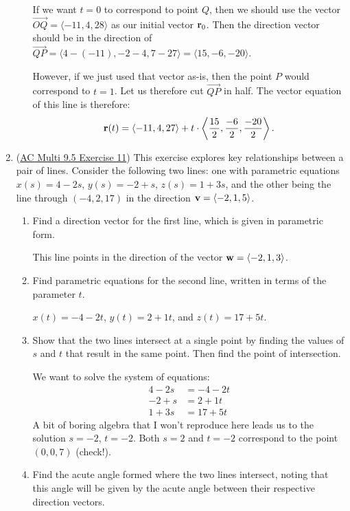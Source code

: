 \begin{enumerate}[leftmargin=0pt]
\begin{enumerate}
	\begin{red}
		If we want $t=0$ to correspond to point $Q$, then we should use the vector $\overrightarrow{OQ} = \langle -11, 4, 28 \rangle$ as our initial vector $\mathbf{r}_0$. Then the direction vector should be in the direction of $\overrightarrow{QP} = \langle 4-(-11), -2-4, 7-27 \rangle = \langle 15, -6, -20\rangle$. 
		
		However, if we just used that vector as-is, then the point $P$ would correspond to $t=1$. Let us therefore cut $\overrightarrow{QP}$ in half. The vector equation of this line is therefore:
		\[\mathbf{r}(t) = \langle -11, 4, 27 \rangle + t\cdot\left\langle \frac{15}{2}, \frac{-6}{2}, \frac{-20}{2}\right\rangle.\]
	\end{red}
\end{enumerate}
	
\item (\href{https://activecalculus.org/multi/S-9-5-Lines-Planes.html#Ez_9_5_2}{AC Multi 9.5 Exercise 11}) This exercise explores key relationships between a pair of lines. Consider the following two lines: one with parametric equations $x(s) = 4 - 2s$, $y(s) = -2 + s$, $z(s) = 1+3s$, and the other being the line through $(-4,2,17)$ in the direction $\mathbf{v} = \langle -2, 1, 5\rangle$.
\begin{enumerate}
	\item Find a direction vector for the first line, which is given in parametric form.
	
	\begin{red}
		This line points in the direction of the vector $\mathbf{w} = \langle -2, 1, 3\rangle$.
	\end{red}
	\item Find parametric equations for the second line, written in terms of the parameter $t$.
	
	\begin{red}
		$x(t) = -4 - 2t$, $y(t) = 2+1t$, and $z(t) = 17+5t$.
	\end{red}
	\item Show that the two lines intersect at a single point by finding the values of $s$ and $t$ that result in the same point. Then find the point of intersection.
	
	\begin{red}
		We want to solve the system of equations:
		\begin{align*}
			4 - 2s &= -4 - 2t \\
			-2 + s &= 2 + 1t \\
			1 + 3s &= 17 + 5t
		\end{align*}
		A bit of boring algebra that I won't reproduce here leads us to the solution $s = -2$, $t = -2$. Both $s = 2$ and $t = -2$ correspond to the point $(0, 0, 7)$ (check!).
	\end{red}
	\item Find the acute angle formed where the two lines intersect, noting that this angle will be given by the acute angle between their respective direction vectors.
	

\end{enumerate}
\end{enumerate}
